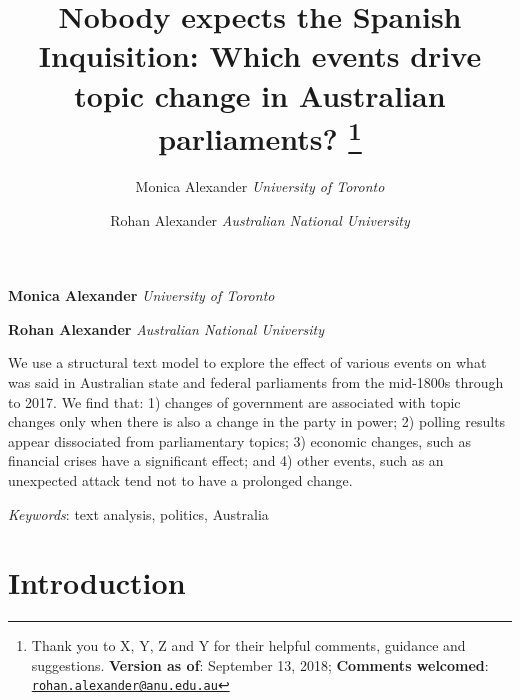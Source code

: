 \documentclass[12pt,]{article}
\title{Nobody expects the Spanish Inquisition: Which events drive topic change
in Australian parliaments? \thanks{Thank you to X, Y, Z and Y for their helpful comments, guidance and
suggestions. \textbf{Version as of}: September 13, 2018;
\textbf{Comments welcomed}:
\href{mailto:rohan.alexander@anu.edu.au}{\nolinkurl{rohan.alexander@anu.edu.au}}}  }
\author{\Large Monica Alexander\vspace{0.05in} \newline\normalsize\emph{University of Toronto}   \and \Large Rohan Alexander\vspace{0.05in} \newline\normalsize\emph{Australian National University}  }
\date{}
\newcommand*{\authorfont}{\fontfamily{phv}\selectfont}
\renewenvironment{abstract}
 {{%
    \setlength{\leftmargin}{0mm}
    \setlength{\rightmargin}{\leftmargin}%
  }%
  \relax}
 {\endlist}
\begin{document}
	
%

{%
\setlength{\parindent}{0pt}
\thispagestyle{plain}
{\fontsize{18}{20}\selectfont\raggedright 
\maketitle  %

}

{
   \vskip 13.5pt\relax \normalsize\fontsize{11}{12} 
\textbf{\authorfont Monica Alexander} \hskip 15pt \emph{\small University of Toronto}   \par \textbf{\authorfont Rohan Alexander} \hskip 15pt \emph{\small Australian National University}   

}

}








\begin{abstract}

    \hbox{\vrule height .2pt width 39.14pc}

    \vskip 8.5pt %

\noindent We use a structural text model to explore the effect of various events
on what was said in Australian state and federal parliaments from the
mid-1800s through to 2017. We find that: 1) changes of government are
associated with topic changes only when there is also a change in the
party in power; 2) polling results appear dissociated from parliamentary
topics; 3) economic changes, such as financial crises have a significant
effect; and 4) other events, such as an unexpected attack tend not to
have a prolonged change.


\vskip 8.5pt \noindent \emph{Keywords}: text analysis, politics, Australia \par

    \hbox{\vrule height .2pt width 39.14pc}



\end{abstract}


\vskip 6.5pt


\noindent  \section{Introduction}\label{introduction}
\end{document}

